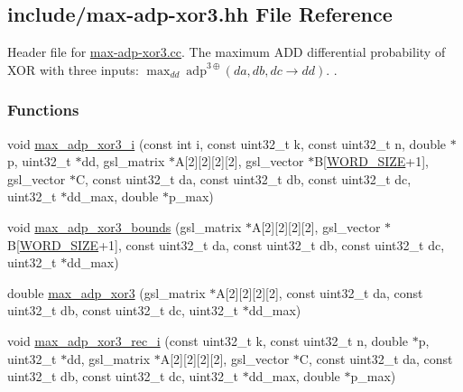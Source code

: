 \hypertarget{max-adp-xor3_8hh}{\subsection{include/max-\/adp-\/xor3.hh \-File \-Reference}
\label{max-adp-xor3_8hh}
}


\-Header file for \hyperlink{max-adp-xor3_8cc}{max-\/adp-\/xor3.\-cc}. \-The maximum \-A\-D\-D differential probability of \-X\-O\-R with three inputs\-: $\max_{dd}~\mathrm{adp}^{3\oplus}(da, db, dc \rightarrow dd)$. .  


\subsubsection*{\-Functions}
\begin{DoxyCompactItemize}
\item 
void \hyperlink{max-adp-xor3_8hh_ad25cee0908ad1bc426aae280885d7581}{max\-\_\-adp\-\_\-xor3\-\_\-i} (const int i, const uint32\-\_\-t k, const uint32\-\_\-t n, double $\ast$p, uint32\-\_\-t $\ast$dd, gsl\-\_\-matrix $\ast$\-A\mbox{[}2\mbox{]}\mbox{[}2\mbox{]}\mbox{[}2\mbox{]}\mbox{[}2\mbox{]}, gsl\-\_\-vector $\ast$\-B\mbox{[}\hyperlink{common_8hh_a92ed8507d1cd2331ad09275c5c4c1c89}{\-W\-O\-R\-D\-\_\-\-S\-I\-Z\-E}+1\mbox{]}, gsl\-\_\-vector $\ast$\-C, const uint32\-\_\-t da, const uint32\-\_\-t db, const uint32\-\_\-t dc, uint32\-\_\-t $\ast$dd\-\_\-max, double $\ast$p\-\_\-max)
\item 
void \hyperlink{max-adp-xor3_8hh_a7134183c8951be68d7e94f47793d2f0d}{max\-\_\-adp\-\_\-xor3\-\_\-bounds} (gsl\-\_\-matrix $\ast$\-A\mbox{[}2\mbox{]}\mbox{[}2\mbox{]}\mbox{[}2\mbox{]}\mbox{[}2\mbox{]}, gsl\-\_\-vector $\ast$\-B\mbox{[}\hyperlink{common_8hh_a92ed8507d1cd2331ad09275c5c4c1c89}{\-W\-O\-R\-D\-\_\-\-S\-I\-Z\-E}+1\mbox{]}, const uint32\-\_\-t da, const uint32\-\_\-t db, const uint32\-\_\-t dc, uint32\-\_\-t $\ast$dd\-\_\-max)
\item 
double \hyperlink{max-adp-xor3_8hh_aa606808c54de33ad16170106454312a7}{max\-\_\-adp\-\_\-xor3} (gsl\-\_\-matrix $\ast$\-A\mbox{[}2\mbox{]}\mbox{[}2\mbox{]}\mbox{[}2\mbox{]}\mbox{[}2\mbox{]}, const uint32\-\_\-t da, const uint32\-\_\-t db, const uint32\-\_\-t dc, uint32\-\_\-t $\ast$dd\-\_\-max)
\item 
void \hyperlink{max-adp-xor3_8hh_a6033c1a639b25e76ffcecd62569fbd05}{max\-\_\-adp\-\_\-xor3\-\_\-rec\-\_\-i} (const uint32\-\_\-t k, const uint32\-\_\-t n, double $\ast$p, uint32\-\_\-t $\ast$dd, gsl\-\_\-matrix $\ast$\-A\mbox{[}2\mbox{]}\mbox{[}2\mbox{]}\mbox{[}2\mbox{]}\mbox{[}2\mbox{]}, gsl\-\_\-vector $\ast$\-C, const uint32\-\_\-t da, const uint32\-\_\-t db, const uint32\-\_\-t dc, uint32\-\_\-t $\ast$dd\-\_\-max, double $\ast$p\-\_\-max)

\end{DoxyCompactItemize}
